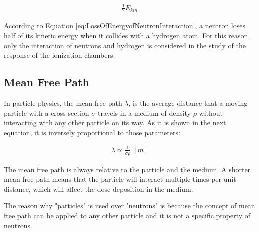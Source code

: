 \begin{align}
\label{eq:LossOfEnergyofNeutronInteraction}
    \frac{1}{2} E_{kin}
\end{align}

According to Equation \ref{eq:LossOfEnergyofNeutronInteraction}, a neutron loses half of its kinetic energy when it collides with a hydrogen atom. For this reason, only the interaction of neutrons and hydrogen is considered in the study of the response of the ionization chambers.

\subsection{Mean Free Path}
In particle physics, the mean free path $\lambda$, is the average distance that a moving particle with a cross section $\sigma$ travels in a medium of density $\rho$ without interacting with any other particle on its way. As it is shown in the next equation, it is inversely proportional to those parameters:

\begin{align} 
    \label{eq:MeanFreePath}
    {\lambda \propto \frac{1}{\sigma \rho} } \; [\unit{m}]
\end{align}

The mean free path is always relative to the particle and the medium. A shorter mean free path means that the particle will interact multiple times per unit distance, which will affect the dose deposition in the medium.

The reason why "particles" is used over "neutrons" is because the concept of mean free path can be applied to any other particle and it is not a specific property of neutrons. 